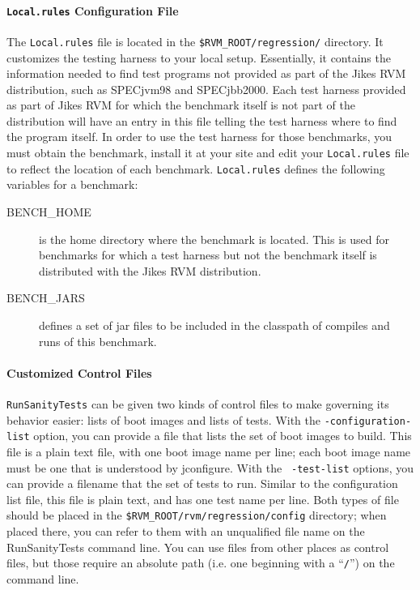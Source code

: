\paragraph{\texttt{\textbf{Local.rules}} Configuration File}

 The {\tt Local.rules} file is located in the
 {\tt \$RVM\_\-ROOT/\-re\-gres\-sion/} directory.
It customizes the testing harness to your local
setup.  Essentially, it contains the information needed to find test
programs not provided as part of the Jikes RVM distribution, such as
SPECjvm\Rweb{}98 and SPECjbb\Rboth{}2000.  Each test harness
provided as part of Jikes RVM for which the benchmark itself is
not part of the distribution will have an entry in this file telling
the test harness where to find the program itself.  In order to use
the test harness for those benchmarks, you must obtain the benchmark,
install it at your site and edit your {\tt{Local.rules}} file to
reflect the location of each benchmark.  {\tt{Local.rules}} defines
the following variables for a benchmark:
\begin{description}
\item[BENCH\_HOME] is the home directory where the benchmark is
located.  This is used for benchmarks for which a test harness but not
the benchmark itself is distributed with the Jikes RVM distribution. 
\item[BENCH\_JARS] defines a set of jar files to be included in the
classpath of compiles and runs of this benchmark.
\end{description}

\paragraph{Customized Control Files}

 {\tt{RunSanityTests}} can be given two kinds of control files to make
governing its behavior easier: lists of boot images and lists of
tests.  With the {\tt -con\-fi\-gu\-ra\-tion-list} option, you can provide a
file that lists the set of boot images to build.  This file is a plain
text file, with one boot image name per line; each boot image name
must be one that is understood by jconfigure.  With the {\tt
-test-list} options, you can provide a filename that the set of tests
to run.  Similar to the configuration list file, this file is plain
text, and has one test name per line.  Both types of file should be
placed in the {\tt \$RVM\_ROOT/rvm/regression/config} directory; when placed
there, you can refer to them with an unqualified file name on the
RunSanityTests command line.  You can use files from other places as
control files, but those require an absolute path (i.e. one beginning
with a ``{\tt /}'') on the command line.


